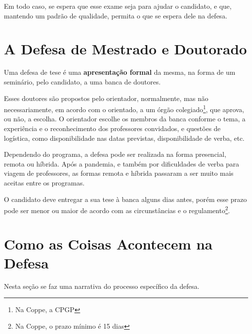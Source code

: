 Em todo caso, se espera que esse exame seja para ajudar o candidato, e que, mantendo um padrão de qualidade, permita o que se espera dele na defesa.

\section{A Defesa de Mestrado e Doutorado}

Uma defesa de tese é uma \textbf{apresentação formal} da mesma, na forma de um seminário, pelo candidato, a uma banca de doutores.

Esses doutores são propostos pelo orientador, normalmente, mas não necessariamente, em acordo com o orientado, a um órgão colegiado\footnote{Na Coppe, a CPGP}, que aprova, ou não, a escolha. O orientador escolhe os membros da banca conforme o tema, a experiência e o reconhecimento dos professores convidados, e questões de logística, como disponibilidade nas datas previstas, disponibilidade de verba, etc.

Dependendo do programa, a defesa pode ser realizada na forma presencial, remota ou híbrida. Após a pandemia, e também por dificuldades de verba para viagem de professores, as formas remota e híbrida passaram a ser muito mais aceitas entre os programas.

O candidato deve entregar a sua tese  à banca alguns dias antes, porém esse prazo pode ser menor ou maior de acordo com as circunstâncias e o regulamento\footnote{Na Coppe, o prazo mínimo é 15 dias}. 


\section{Como as Coisas Acontecem na Defesa}

Nesta seção se faz uma narrativa do processo específico da defesa.

